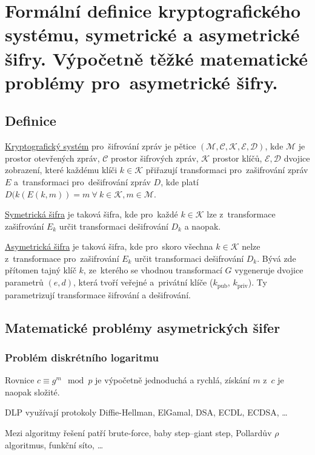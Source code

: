 \section{Formální definice kryptografického systému, symetrické a asymetrické šifry. Výpočetně těžké matematické problémy pro~asymetrické šifry.}

\subsection{Definice}

\uline{Kryptografický systém} pro~šifrování zpráv je pětice $(\mathcal{M}, \mathcal{C}, \mathcal{K}, \mathcal{E}, \mathcal{D})$, kde
$\mathcal{M}$ je prostor otevřených zpráv,
$\mathcal{C}$ prostor šifrových zpráv,
$\mathcal{K}$ prostor klíčů,
$\mathcal{E}, \mathcal{D}$ dvojice zobrazení, které každému klíči $k \in \mathcal{K}$ přiřazují transformaci pro~zašifrování zpráv $E$ a~transformaci pro~dešifrování zpráv $D$, kde platí $D(k(E(k,m))=m \ \forall \ k \in \mathcal{K}, m \in \mathcal{M}$.

\uline{Symetrická šifra} je taková šifra, kde pro~každé $k \in \mathcal{K}$ lze z~transformace zašifrování $E_k$ určit transformaci dešifrování $D_k$ a naopak.

\uline{Asymetrická šifra} je taková šifra, kde pro~skoro všechna $k \in \mathcal{K}$ nelze z~transformace pro~zašifrování $E_k$ určit transformaci dešifrování $D_k$.
Bývá zde přítomen tajný klíč $k$, ze~kterého se vhodnou transformací $G$ vygeneruje dvojice parametrů $(e, d)$, která tvoří veřejné a~privátní klíče ($k_\text{pub}$, $k_\text{priv}$).
Ty parametrizují transformace šifrování a dešifrování.

\subsection{Matematické problémy asymetrických šifer}

\subsubsection{Problém diskrétního logaritmu}

Rovnice $c \equiv g^m \mod p$ je výpočetně jednoduchá a rychlá, získání $m$ z~$c$ je naopak složité.

DLP využívají protokoly Diffie-Hellman, ElGamal, DSA, ECDL, ECDSA, \dots

Mezi algoritmy řešení patří brute-force, baby step--giant step, Pollardův $\rho$ algoritmus, funkční síto, \dots

